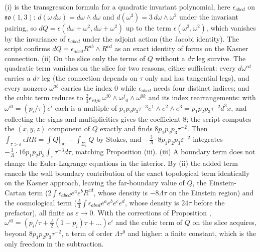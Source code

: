 (i) is the transgression formula for a quadratic invariant polynomial, here $\epsilon_{abcd}$ on $\mathfrak{so}(1,3)$: $d(\omega\,d\omega) = d\omega\wedge d\omega$ and $d(\omega^3) = 3\,d\omega\wedge\omega^2$ under the invariant pairing, so $dQ = \epsilon(d\omega + \omega^2, d\omega + \omega^2)$ up to the term $\epsilon(\omega^2,\omega^2)$, which vanishes by the invariance of $\epsilon_{abcd}$ under the adjoint action (the Jacobi identity). The script confirms $dQ = \epsilon_{abcd}R^{ab}\wedge R^{cd}$ as an exact identity of forms on the Kasner connection. (ii) On the slice only the terms of $Q$ without a $d\tau$ leg survive. The quadratic term vanishes on the slice for two reasons, either sufficient: every $d\omega^{cd}$ carries a $d\tau$ leg (the connection depends on $\tau$ only and has tangential legs), and every nonzero $\omega^{ab}$ carries the index $0$ while $\epsilon_{abcd}$ needs four distinct indices; and the cubic term reduces to $\tfrac23\epsilon_{i0jk}\,\omega^{i0}\wedge\omega^{j}{}_{0}\wedge\omega^{0k}$ and its index rearrangements: with $\omega^{i0} = (p_i/\tau)e^i$ each is a multiple of $p_1p_2p_3\tau^{-3}e^1\wedge e^2\wedge e^3 = p_1p_2p_3\tau^{-2}d^3x$, and collecting the signs and multiplicities gives the coefficient $8$; the script computes the $(x,y,z)$ component of $Q$ exactly and finds $8p_1p_2p_3\tau^{-2}$. Then $\int_{\tau>\varepsilon}\epsilon RR = \int Q\big|_{\text{far}} - \int_{\Sigma_\varepsilon}Q$ by Stokes, and $-\tfrac3\Lambda\cdot 8p_1p_2p_3\varepsilon^{-2}$ integrates $-\tfrac{3}{\Lambda}\cdot 16 p_1p_2p_3\int_\varepsilon\tau^{-3}d\tau$, matching Proposition (iii). (iii) A boundary term does not change the Euler-Lagrange equations in the interior. By (ii) the added term cancels the wall boundary contribution of the exact topological term identically on the Kasner approach, leaving the far-boundary value of $Q$, the Einstein-Cartan term ($2\int\epsilon_{abcd}e^ae^bR^{cd}$, whose density is $-8\Lambda\tau$ on the Einstein region) and the cosmological term ($\tfrac{\Lambda}{3}\int\epsilon_{abcd}e^ae^be^ce^d$, whose density is $24\tau$ before the prefactor), all finite as $\varepsilon\to 0$. With the corrections of Proposition , $\omega^{i0} = (p_i/\tau + \tfrac{\Lambda}{2}(1-p_i)\tau + \dots)e^i$ and the cubic term of $Q$ on the slice acquires, beyond $8p_1p_2p_3\tau^{-2}$, a term of order $\Lambda\tau^0$ and higher: a finite constant, which is the only freedom in the subtraction.
